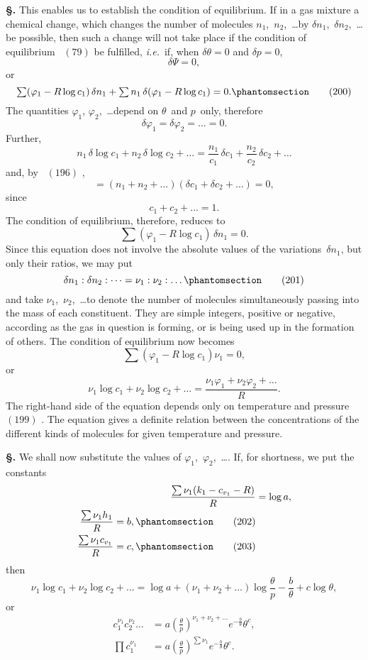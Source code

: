 \documentclass[12pt]{book}[2005/09/16]
\newcommand{\Chg}[2]{#2}
\newcommand{\Add}[1]{\Chg{}{#1}}
\newcommand{\Section}[1]{
  \medskip\par\textbf{§\;#1}
  \label{section:#1}
}
\newcommand{\Tag}[1]{%
  \phantomsection\label{eqn:#1}\tag*{\ensuremath{#1}}%
}
\newcommand{\Eq}[1]{%
  \hyperref[eqn:#1]{\ensuremath{#1}}%
}
\newcommand{\PageSep}[1]{\ignorespaces}
\newcommand{\ie}{\emph{i.e.}}
\newcommand{\efrac}[2]{\tfrac{#1}{#2}}
\newcommand{\tsum}{\mathop{\textstyle\sum}\limits}
\begin{document}
\Section{240.} This enables us to establish the condition of
%
equilibrium. If in a gas mixture a chemical change, which
%
changes the number of molecules $n_{1}$,~$n_{2}$,~\dots by $\delta n_{1}$,~$\delta n_{2}$,~\dots
be possible, then such a change will not take place if the
condition of equilibrium~\Eq{(79)} be fulfilled, \ie\ if, when $\delta \theta = 0$
and $\delta p = 0$,
\[
\delta \Psi = 0,
\]
or
\[
\tsum (\varphi_{1} - R \log c_{1})\, \delta n_{1}
  + \tsum n_{1}\, \delta(\varphi_{1} - R \log c_{1}) = 0.
\Tag{(200)}
\]
The quantities $\varphi_{1}$, $\varphi_{2}$\Add{,}~\dots depend on $\theta$~and $p$~only, therefore
\[
\delta \varphi_{1} = \delta \varphi_{2} = \dots = 0.
\]
Further,
\[
n_{1}\, \delta \log c_{1} + n_{2}\, \delta \log c_{2} + \dots
  = \frac{n_{1}}{c_{1}}\, \delta c_{1} + \frac{n_{2}}{c_{2}}\, \delta c_{2} + \dots
\]
and, by~\Eq{(196)},
\[
= (n_{1} + n_{2} + \dots)(\delta c_{1} + \delta c_{2} + \dots) = 0,
\]
since
\[
c_{1} + c_{2} + \dots = 1.
\]
\PageSep{216}
The condition of equilibrium, therefore, reduces to
\[
\tsum (\varphi_{1} - R \log c_{1})\, \delta n_{1} = 0.
\]
Since this equation does not involve the absolute values of
the variations~$\delta n_{1}$, but only their ratios, we may put
\[
\delta n_{1} : \delta n_{2} : \dots = \nu_{1} : \nu_{2} : \dots
\Tag{(201)}
\]
and take $\nu_{1}$,~$\nu_{2}$\Add{,}~\dots to denote the number of molecules
simultaneously passing into the mass of each constituent.
They are simple integers, positive or negative, according as
the gas in question is forming, or is being used up in the
formation of others. The condition of equilibrium now
becomes
\[
\tsum (\varphi_{1} - R \log c_{1}) \nu_{1} = 0,
\]
or
\[
\nu_{1} \log c_{1} + \nu_{2} \log c_{2} + \dots
  = \frac{\nu_{1} \varphi_{1} + \nu_{2} \varphi_{2} + \dots}{R}.
\]
The right-hand side of the equation depends only on temperature
and pressure~\Eq{(199)}. The equation gives a definite
relation between the concentrations of the different kinds of
molecules for given temperature and pressure.

\Section{241.} We shall now substitute the values of $\varphi_{1}$,~$\varphi_{2}$,~\dots\Add{.}
If, for shortness, we put the constants
\begin{align*}
\frac{\tsum \nu_{1} (k_{1} - c_{v_{1}} - R)}{R} &= \log a\Add{,} \\
\frac{\tsum \nu_{1} h_{1}}{R} = b\Add{,}
\Tag{(202)} \\
\frac{\tsum \nu_{1} c_{v_{1}}}{R} = c\Add{,}
\Tag{(203)} \\
\end{align*}
\PageSep{217}
then
\[
\nu_{1} \log c_{1} + \nu_{2} \log c_{2} + \dots
  = \log a + (\nu_{1} + \nu_{2} + \dots) \log \frac{\theta}{p} - \frac{b}{\theta} + c \log \theta,
\]
or
\begin{align*}
c_{1}^{\nu_{1}} c_{2}^{\nu_{2}} \dots &= a\left(\frac{\theta}{p}\right)^{\nu_{1} + \nu_{2} + \dots} e^{-\efrac{b}{\theta}} \theta^{c}\Add{,} \\
\prod c_{1}^{\nu_{1}} &= a\left(\frac{\theta}{p}\right)^{\tsum \nu_{1}} e^{-\efrac{b}{\theta}} \theta^{c}\Add{.}
\end{align*}
\end{document}
